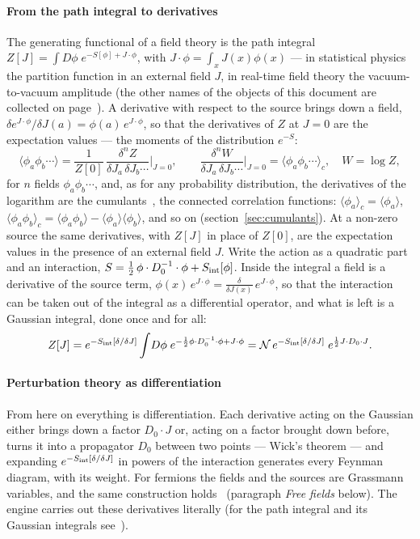 \documentclass[11pt,a4paper]{article}
\begin{document}
\paragraph{From the path integral to derivatives} The generating functional of a field theory is the path integral
$Z[J]=\int\!D\phi\;e^{-S[\phi]+J\cdot\phi}$, with $J\cdot\phi=\int_xJ(x)\phi(x)$ --- in statistical physics the partition function in an
external field $J$, in real-time field theory the vacuum-to-vacuum amplitude (the other names of the objects of this
document are collected on page~\pageref{sec:names}). A derivative with respect to the source brings
down a field, $\delta e^{J\cdot\phi}/\delta J(a)=\phi(a)\,e^{J\cdot\phi}$, so that the derivatives of $Z$ at $J=0$ are the
expectation values --- the moments of the distribution $e^{-S}$:
\[
\langle\phi_a\phi_b\cdots\rangle=\frac1{Z[0]}\,\frac{\delta^nZ}{\delta J_a\,\delta J_b\cdots}\Big|_{J=0},\qquad
\frac{\delta^nW}{\delta J_a\,\delta J_b\cdots}\Big|_{J=0}=\langle\phi_a\phi_b\cdots\rangle_c,\quad W=\log Z,
\]
for $n$ fields $\phi_a\phi_b\cdots$,
and, as for any probability distribution, the derivatives of the logarithm are the cumulants~\cite{Kubo1962}, the
connected correlation functions: $\langle\phi_a\rangle_c=\langle\phi_a\rangle$, $\langle\phi_a\phi_b\rangle_c=\langle\phi_a\phi_b\rangle-\langle\phi_a\rangle\langle\phi_b
\rangle$, and so on (section~\ref{sec:cumulants}). At a non-zero source the same derivatives, with $Z[J]$ in
place of $Z[0]$, are the expectation values in the presence of an external field $J$.
Write the action as a quadratic part and an interaction, $S=\frac12\,\phi\cdot D_0^{-1}\cdot\phi+S_{\rm int}[\phi]$. Inside the
integral a field is a derivative of the source term, $\phi(x)\,e^{J\cdot\phi}=\frac{\delta}{\delta J(x)}\,e^{J\cdot\phi}$, so that the
interaction can be taken out of the integral as a differential operator, and what is left is a Gaussian integral, done
once and for all:
\[
Z[J]=e^{-S_{\rm int}[\delta/\delta J]}\int\!D\phi\;e^{-\frac12\phi\cdot D_0^{-1}\cdot\phi+J\cdot\phi}
=\mathcal N\,e^{-S_{\rm int}[\delta/\delta J]}\;e^{\frac12J\cdot D_0\cdot J}.
\]

\paragraph{Perturbation theory as differentiation} From here on everything is differentiation. Each derivative acting on the Gaussian either brings down a factor $D_0\cdot J$
or, acting on a factor brought down before, turns it into a propagator $D_0$ between two points --- Wick's theorem --- and expanding
$e^{-S_{\rm int}[\delta/\delta J]}$ in powers of the interaction generates every Feynman diagram, with its weight. For
fermions the fields and the sources are Grassmann variables, and the same construction
holds~\cite{Berezin1966,NegeleOrland} (paragraph \emph{Free fields} below). The
engine carries out these derivatives literally (for the path integral and its Gaussian integrals
see~\cite{NegeleOrland,ZinnJustin2002,AltlandSimons,PeskinSchroeder}).
\end{document}

